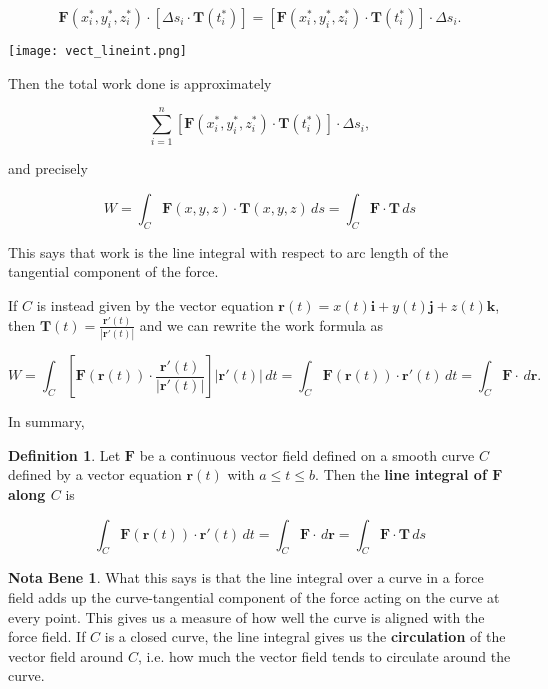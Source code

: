 \documentclass[11pt,oneside,english]{amsart}
\theoremstyle{definition}
\newtheorem*{definition}{Definition}
\newtheorem*{note}{Nota Bene}
\begin{document}
\[
\mathbf{F}(x_i^*,y_i^*,z_i^*)\cdot[\Delta s_i\cdot\mathbf{T}(t_i^*)]= [\mathbf{F}(x_i^*,y_i^*,z_i^*)\cdot\mathbf{T}(t_i^*)]\cdot\Delta s_i.
\]

\begin{center}
\texttt{[image: vect\_lineint.png]}
\end{center}


Then the total work done is approximately 

\[
\sum_{i=1}^n [\mathbf{F}(x_i^*,y_i^*,z_i^*)\cdot\mathbf{T}(t_i^*)]\cdot\Delta s_i,
\]

and precisely

\[
W=\int_C\mathbf{F}(x,y,z)\cdot\mathbf{T}(x,y,z)\,ds=\int_C \mathbf{F}\cdot \mathbf{T}\,ds
\]

This says that work is the line integral with respect to arc length of the tangential component of the force.

If $C$ is instead given by the vector equation $\mathbf{r}(t)=x(t)\mathbf{i}+y(t)\mathbf{j}+z(t)\mathbf{k}$, then $\displaystyle \mathbf{T}(t)=\frac{\mathbf{r}'(t)}{|\mathbf{r}'(t)|}$ and we can rewrite the work formula as

\[
W=\int_C\left[\mathbf{F}(\mathbf{r}(t))\cdot \frac{\mathbf{r}'(t)}{|\mathbf{r}'(t)|}\right]|\mathbf{r}'(t)|\,dt= \int_C\mathbf{F}(\mathbf{r}(t))\cdot\mathbf{r}'(t)\,dt=\int_C\mathbf{F}\cdot\,d\mathbf{r}.
\]

In summary,

\begin{definition}
Let $\mathbf{F}$ be a continuous vector field defined on a smooth curve $C$ defined by a vector equation $\mathbf{r}(t)$ with $a\leq t\leq b$. Then the \textbf{line integral of $\mathbf{F}$ along $C$} is

\[\boxed{
\int_C\mathbf{F}(\mathbf{r}(t))\cdot\mathbf{r}'(t)\,dt=\int_C\mathbf{F}\cdot\,d\mathbf{r}=\int_C\mathbf{F}\cdot\mathbf{T}\,ds
}
\]
\end{definition}

\begin{note}
What this says is that the line integral over a curve in a force field adds up the curve-tangential component of the force acting on the curve at every point. This gives us a measure of how well the curve is aligned with the force field. If $C$ is a closed curve, the line integral gives us the \textbf{circulation} of the vector field around $C$, i.e. how much the vector field tends to circulate around the curve.
\end{note}
\end{document}
